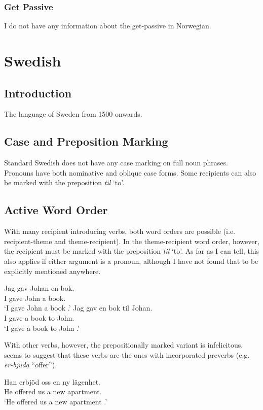 \subsubsection{Get Passive}
I do not have any information about the get-passive in Norwegian.


\section{Swedish}\label{sec:Swedish}

\subsection{Introduction}
The language of Sweden from 1500 onwards.
\subsection{Case and Preposition Marking}
Standard Swedish does not have any case marking on full noun phrases. Pronouns have both nominative and oblique case forms. Some recipients can also be marked with the preposition \emph{til} `to'.
\subsection{Active Word Order}
With many recipient introducing verbs, both word orders are possible (i.e. recipient-theme and theme-recipient). In the theme-recipient word order, however, the recipient must be marked with the preposition \emph{til} `to'. As far as I can tell, this also applies if either argument is a pronoun, although I have not found that to be explicitly mentioned anywhere.
\begin{exe}
\ex 
\begin{xlist}
\ex \gll Jag gav Johan en bok.\\
I gave John a book.\\
\trans `I gave John a book \citep{Holmberg.1995}.'
\ex \gll Jag gav en bok til Johan.\\
I gave a book to John.\\
\trans `I gave a book to John \citep{Holmberg.1995}.'
\end{xlist}
\end{exe}
With other verbs, however, the prepositionally marked variant is infelicitous. \cite{Lundquist.2006} seems to suggest that these verbs are the ones with incorporated preverbs (e.g. \emph{er-bjuda} ``offer''). 
\begin{exe}
\ex
\begin{xlist}
\ex \gll Han erbjöd oss en ny lägenhet.\\
He offered us a new apartment.\\
\trans `He offered us a new apartment \cite{Anward.1989}.'
\end{xlist}
\end{exe}
